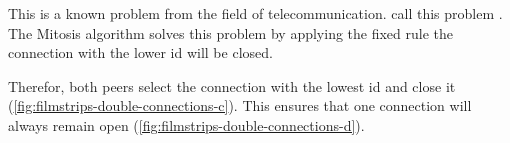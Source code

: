 This is a known problem from the field of telecommunication. \citet[pp. 194-194]{signaling-systems-book} call this problem .
The Mitosis algorithm solves this problem by applying the fixed rule the connection with the lower id will be closed.

Therefor, both peers select the connection with the lowest id and close it (\vref{fig:filmstrips-double-connections-c}). This ensures that one connection will always remain open (\vref{fig:filmstrips-double-connections-d}).